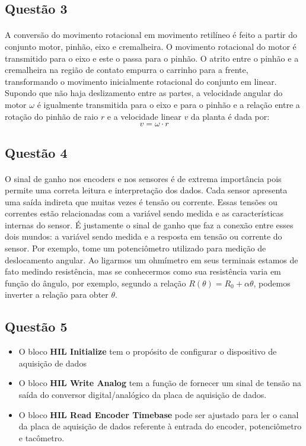 \documentclass[a4paper,11pt]{article}
\begin{document}
\subsection{Questão 3}
\paragraph{} A conversão do movimento rotacional em movimento retilíneo é feito a partir do conjunto motor, pinhão, eixo e cremalheira. O movimento rotacional do motor é transmitido para o eixo e este o passa para o pinhão. O atrito entre
o pinhão e a cremalheira na região de contato empurra o carrinho para a frente, transformando o movimento inicialmente
rotacional do conjunto em linear. Supondo que não haja deslizamento entre as partes, a velocidade angular do motor 
$\omega$ é igualmente transmitida para o eixo e para o pinhão e a relação entre a rotação do pinhão de raio $r$ e a 
velocidade linear $v$ da planta é dada por:
\begin{equation}
	v = \omega \cdot r
\end{equation}
\subsection{Questão 4}
\paragraph{} O sinal de ganho nos encoders e nos sensores é de extrema importância pois permite uma correta
leitura e interpretação dos dados. Cada sensor apresenta uma saída indireta que muitas vezes é tensão ou corrente.
Essas tensões ou correntes estão relacionadas com a variável sendo medida e as características internas 
do sensor. É justamente o sinal de ganho que faz a conexão entre esses dois mundos: a variável sendo medida
e a resposta em tensão ou corrente do sensor. Por exemplo, tome um potenciômetro utilizado para medição de 
deslocamento angular. Ao ligarmos um ohmímetro em seus terminais estamos de fato medindo resistência, mas 
se conhecermos como sua resistência varia em função do ângulo, por exemplo, segundo a relação 
$R(\theta) = R_0 + \alpha \theta $, podemos inverter a relação para obter $\theta$.

\subsection{Questão 5}

\begin{itemize}
	\item 
O bloco \textbf{HIL Initialize} tem o propósito de configurar o dispositivo de aquisição de dados
	\item 
O bloco\textbf{ HIL Write Analog} tem a função de fornecer um sinal de tensão na saída do conversor digital/analógico da placa de aquisição de dados.
	\item 
O bloco \textbf{HIL Read Encoder Timebase} pode ser ajustado para ler o canal da placa de aquisição de dados referente à entrada do encoder, potenciômetro e tacômetro.
\end{itemize}
\end{document}
